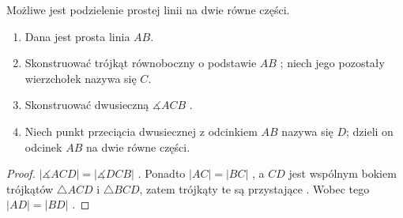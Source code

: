 \documentclass[12pt, a4paper]{scrartcl}
\begin{document}
\begin{theorem}
    Możliwe jest podzielenie prostej linii na dwie równe części.

    \begin{enumerate}
        \item Dana jest prosta linia \(AB\).
        \item Skonstruować trójkąt równoboczny o podstawie \(AB\) ;
            niech jego pozostały wierzchołek nazywa się \(C\).
        \item Skonstruować dwusieczną \(\measuredangle ACB\) .
        \item Niech punkt przeciącia dwusiecznej z odcinkiem \(AB\) nazywa się
            \(D\); dzieli on odcinek \(AB\) na dwie równe części.
    \end{enumerate}

    \begin{figure}[!h]
        \begin{center}
        \end{center}
    \end{figure}

    \begin{proof}
        \(|\measuredangle ACD| = |\measuredangle DCB|\) . Ponadto
        \(|AC| = |BC|\) , a \(CD\) jest wspólnym bokiem trójkątów
        \(\triangle ACD\) i \(\triangle BCD\), zatem trójkąty te są przystające
        . Wobec tego \(|AD| = |BD|\) .
    \end{proof}
\end{theorem}
\end{document}
